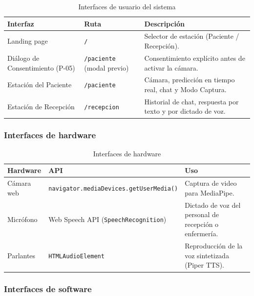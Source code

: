 \begin{table}[H]
    \centering
    \caption{Interfaces de usuario del sistema}
    \label{tab:interfaces-usuario}
    \begin{tabularx}{\textwidth}{l l X}
        \toprule
        \textbf{Interfaz} & \textbf{Ruta} & \textbf{Descripción} \\
        \midrule
        Landing page & \texttt{/} & Selector de estación (Paciente / Recepción). \\
        Diálogo de Consentimiento (P-05) & \texttt{/paciente} (modal previo) & Consentimiento explícito antes de activar la cámara. \\
        Estación del Paciente & \texttt{/paciente} & Cámara, predicción en tiempo real, chat y Modo Captura. \\
        Estación de Recepción & \texttt{/recepcion} & Historial de chat, respuesta por texto y por dictado de voz. \\
        \bottomrule
    \end{tabularx}
\end{table}

\subsubsection{Interfaces de hardware}

\begin{table}[H]
    \centering
    \caption{Interfaces de hardware}
    \label{tab:interfaces-hw}
    \begin{tabularx}{\textwidth}{l l X}
        \toprule
        \textbf{Hardware} & \textbf{API} & \textbf{Uso} \\
        \midrule
        Cámara web & \texttt{navigator.mediaDevices.getUserMedia()} & Captura de video para MediaPipe. \\
        Micrófono & Web Speech API (\texttt{SpeechRecognition}) & Dictado de voz del personal de recepción o enfermería. \\
        Parlantes & \texttt{HTMLAudioElement} & Reproducción de la voz sintetizada (Piper TTS). \\
        \bottomrule
    \end{tabularx}
\end{table}

\subsubsection{Interfaces de software}

